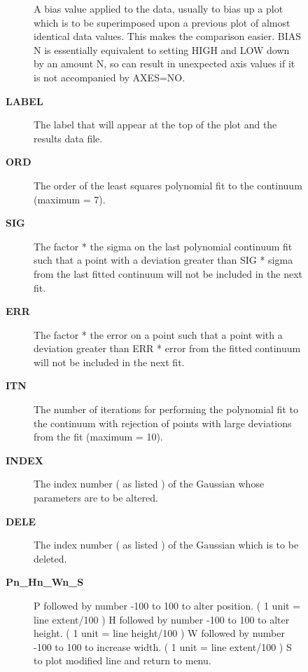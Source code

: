 \begin{description}
\begin{description}
\begin{description}
 A bias value applied to the data, usually to bias up a plot
 which is to be superimposed upon a previous plot of almost
 identical data values.  This makes the comparison easier.
 BIAS N is essentially equivalent to setting HIGH and LOW
 down by an amount N, so can result in unexpected axis
 values if it is not accompanied by AXES=NO.
\item [\textbf{LABEL}]
 The label that will appear at the top of the plot and the
 results data file.
\item [\textbf{ORD}]
 The order of the least squares polynomial fit to the
 continuum (maximum = 7).
\item [\textbf{SIG}]
 The factor * the sigma on the last polynomial continuum fit
 such that a point with a deviation greater than SIG * sigma
 from the last fitted continuum will not be included in the
 next fit.
\item [\textbf{ERR}]
 The factor * the error on a point such that a point with
 a deviation greater than ERR * error from the fitted
 continuum will not be included in the next fit.
\item [\textbf{ITN}]
 The number of iterations for performing the polynomial fit
 to the continuum with rejection of points with large deviations
 from the fit (maximum = 10).
\item [\textbf{INDEX}]
 The index number ( as listed ) of the Gaussian whose
 parameters are to be altered.
\item [\textbf{DELE}]
 The index number ( as listed ) of the Gaussian which is to be
 deleted.
\item [\textbf{Pn\_Hn\_Wn\_S}]

 P followed by number -100 to 100 to alter position.
    ( 1 unit = line extent/100 )
 H followed by number -100 to 100 to alter height.
    ( 1 unit = line height/100 )
 W followed by number -100 to 100 to increase width.
    ( 1 unit = line extent/100 )
 S to plot modified line and return to menu.


\end{description}
\end{description}
\end{description}
